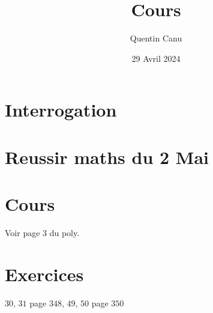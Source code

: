 \documentclass{article}
\title{Cours}
\date{29 Avril 2024}
\author{Quentin Canu}
\begin{document}
\maketitle

\section{Interrogation}
\section{Reussir maths du 2 Mai}
\section{Cours}
Voir page $3$ du poly.
\section{Exercices}
$30$, $31$ page $348$, $49$, $50$ page $350$
\end{document}
